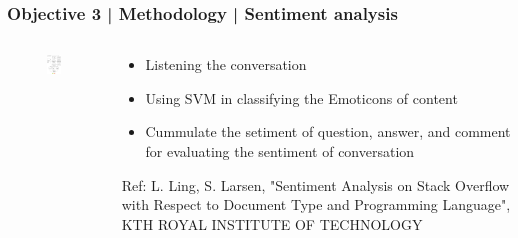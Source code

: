 \documentclass{beamer}
\begin{document}
\begin{frame}
\frametitle{Objective 3 | Methodology | Sentiment analysis}
\begin{columns}
	
	\begin{column}{.5\textwidth}
\begin{figure}
	\includegraphics[width=48mm]{st5.png}	
	
\end{figure}
\end{column}
\begin{column}{.5\textwidth}
\begin{itemize}
	\item Listening the conversation
	\item Using SVM in classifying the Emoticons of content
	\item Cummulate the setiment of question, answer, and comment for evaluating the sentiment of conversation
\end{itemize}
{\tiny Ref: L. Ling, S. Larsen, "Sentiment Analysis on Stack Overflow with
Respect to Document Type and
Programming Language", KTH ROYAL INSTITUTE OF TECHNOLOGY}

\end{column}

\end{columns}	
\end{frame}
\end{document}
